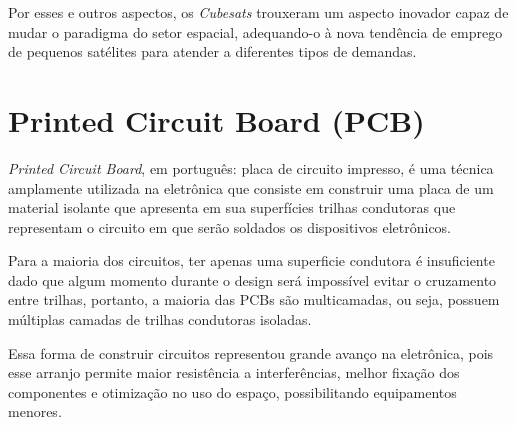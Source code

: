 \noindent
\begin{minipage}{\linewidth}
\label{cubesat1U_dimensions_fig}
\end{minipage}

Por esses e outros aspectos, os \textit{Cubesats} trouxeram um aspecto inovador capaz de mudar o paradigma do setor espacial, adequando-o à nova tendência de emprego de pequenos satélites para atender a diferentes tipos de demandas.

\section{Printed Circuit Board (PCB)}\label{pcb_revision}
\textit{Printed Circuit Board}, em português: placa de circuito impresso, é uma técnica amplamente utilizada na eletrônica que consiste em construir uma placa de um material isolante que apresenta em sua superfícies trilhas condutoras que representam o circuito em que serão soldados os dispositivos eletrônicos.

Para a maioria dos circuitos, ter apenas uma superficie condutora é insuficiente dado que algum momento durante o design será impossível evitar o cruzamento entre trilhas, portanto, a maioria das PCBs são multicamadas, ou seja, possuem múltiplas camadas de trilhas condutoras isoladas.

Essa forma de construir circuitos representou grande avanço na eletrônica, pois esse arranjo permite maior resistência a interferências, melhor fixação dos componentes e otimização no uso do espaço, possibilitando equipamentos menores.

